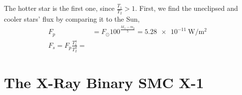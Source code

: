 \documentclass{article}
\begin{document}
The hotter star is the first one, since \(\frac{T_1}{T_2} > 1\).
First, we find the uneclipsed and cooler stars' flux by comparing it to the Sun,
\begin{align}
    F_p &= F_\odot 100^{\frac{M_\odot - m_p}{5}} = \SI{5.28e-11}{\watt\per\meter\squared} \\
    F_s = F_p \frac{T_1^4}{T_2^4} = 
\end{align}


\section{The X-Ray Binary SMC X-1}

\end{document}
